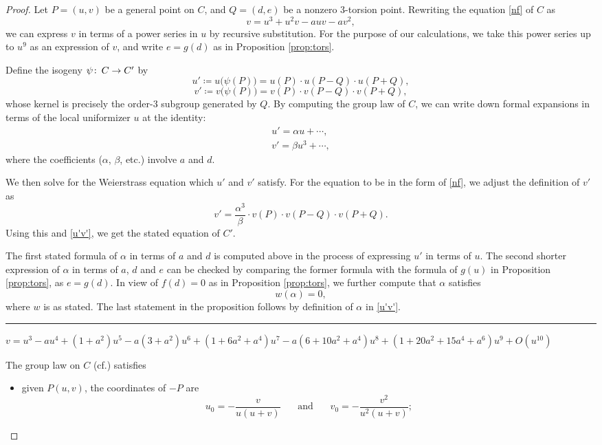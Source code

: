 \documentclass{gtpart}
\theoremstyle{definition}
\theoremstyle{remark}
\def\co{\colon\thinspace}
\newcommand{\cff}[2]{cf.\thinspace{\cite[#1]{#2}}}
\newcommand{\A}{\alpha}
\begin{document}
\begin{proof}
 Let $P = (u,v)$ be a general point on $C$, and $Q = (d,e)$ be a nonzero 3-torsion point.  
 Rewriting the equation \eqref{nf} of $C$ as 
 \[
  v = u^3 + u^2 v - a u v - a v^2, 
 \]
 we can express $v$ in terms of a power series in $u$ by recursive substitution.  
 For the purpose of our calculations, we take this power series up to $u^9$ as an expression of $v$, 
 and write $e = g(d)$ as in Proposition \ref{prop:tors}.  

 Define the isogeny $\psi \co C \to C'$ by 
 \[
  u' \coloneqq u\big(\psi(P)\big) = u(P) \cdot u(P-Q) \cdot u(P+Q), 
 \]
 \[
  v' \coloneqq v\big(\psi(P)\big) = v(P) \cdot v(P-Q) \cdot v(P+Q), 
 \]
 whose kernel is precisely the order-3 subgroup generated by $Q$.  
 By computing the group law of $C$, we can write down formal expansions in terms of the local uniformizer $u$ at the identity: 
 \begin{equation}
 \label{u'v'}
  \begin{array}{l}
   u' = \A u + \cdots, \\
   v' = \beta u^3 + \cdots, 
  \end{array}
 \end{equation}
 where the coefficients ($\A$, $\beta$, etc.) involve $a$ and $d$.  

 We then solve for the Weierstrass equation which $u'$ and $v'$ satisfy.  
 For the equation to be in the form of \eqref{nf}, we adjust the definition of $v'$ as 
 \[
  v' = \frac{\A^3}{\beta} \cdot v(P) \cdot v(P-Q) \cdot v(P+Q).  
 \]
 Using this and \eqref{u'v'}, we get the stated equation of $C'$.  
  
 The first stated formula of $\A$ in terms of $a$ and $d$ is computed above in the process of expressing $u'$ in terms of $u$.  
 The second shorter expression of $\A$ in terms of $a$, $d$ and $e$ can be checked by comparing the former formula with the formula of $g(u)$ in Proposition \ref{prop:tors}, 
 as $e = g(d)$.  In view of $f(d) = 0$ as in Proposition \ref{prop:tors}, we further compute that $\A$ satisfies 
 \[
  w(\A) = 0, 
 \]
 where $w$ is as stated.  
 The last statement in the proposition follows by definition of $\A$ in \eqref{u'v'}.  
\\
\hrule

$v = u^3 - a u^4 + (1 + a^2) u^5 - 
 a (3 + a^2) u^6 + (1 + 6 a^2 + a^4) u^7 - 
 a (6 + 10 a^2 + a^4) u^8 + (1 + 20 a^2 + 15 a^4 + a^6) u^9 + O(u^{10})$

The group law on $C$ (\cff{III.2}{AEC}) satisfies 
\begin{itemize}
 \item given $P(u,v)$, the coordinates of $-P$ are 
 \[
  u_0 = -\frac{v}{u (u + v)}~~~~~~~~\text{and}~~~~~~~~v_0 = -\frac{v^2}{u^2 (u + v)}; 
 \]


\end{itemize}
\end{proof}
\end{document}
